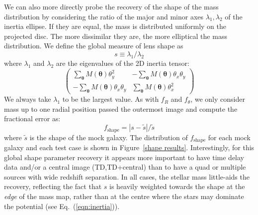 \documentclass[galley,usenatbib]{mn2e}
\renewcommand{\vec}[1]{\ensuremath{\boldsymbol{#1}}}
\newcommand{\figref}[1] {Figure~\ref{#1}}
\newcommand{\eqnref}[1] {Eq.~(\ref{#1})}
\begin{document}
We can also more directly probe the recovery of the shape of the mass
distribution by considering the ratio of the major and minor axes $\lambda_1,
\lambda_2$ of the inertia ellipse. If they are equal, the mass is distributed
uniformly on the projected disc. The more dissimilar they are, the more
elliptical the mass distribution. We define the global measure of lens shape as
%
\begin{equation} 
    s \equiv \lambda_1/\lambda_2
\end{equation} 
%
where $\lambda_1$ and $\lambda_2$ are the eigenvalues of the 2D inertia tensor:
%
\begin{equation}
\left(
\begin{matrix}
   \sum_{\vec\theta} M(\vec\theta) \theta^2_y 
    & - \sum_{\vec\theta} M(\vec\theta) \theta_x \theta_y \\
    - \sum_{\vec\theta} M(\vec\theta) \theta_x \theta_y
    & \sum_{\vec\theta} M(\vec\theta) \theta^2_x
\end{matrix}
\right)
    \label{eqn:inertia}
\end{equation}
%
We always take $\lambda_1$ to be the largest value. As with $f_R$ and
$f_\theta$, we only consider mass up to one radial position passed the
outermost image and compute the fractional error as:
%
\begin{equation} \label{ferror shape}
  f_\mathrm{shape} = \left|s - \tilde s\right|  / \tilde s
\end{equation}
%
where $\tilde s$ is the shape of the mock galaxy. The distribution of
$f_\mathrm{shape}$ for each mock galaxy and each test case is shown in
\figref{shape results}.  Interestingly, for this global shape parameter
recovery it appears more important to have time delay data and/or a central
image (TD,TD+central) than to have a quad or multiple sources with wide redshift
separation. In all cases, the stellar mass little-aids the recovery, reflecting
the fact that $s$ is heavily weighted towards the shape at the {\it edge} of
the mass map, rather than at the centre where the stars may dominate the
potential (see \eqnref{eqn:inertia}).
\end{document}
